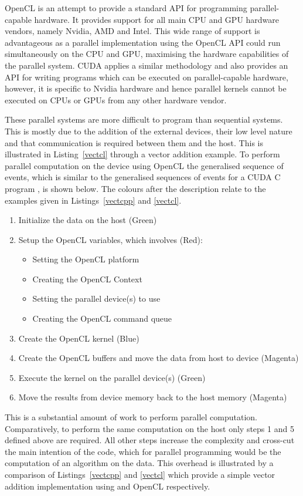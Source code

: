 \documentclass{sig-alternate-05-2015}
\begin{document}
OpenCL is an attempt to provide a standard API for programming parallel-capable
hardware. It provides support for all main CPU and GPU hardware vendors, namely
Nvidia, AMD and Intel. This wide range of support is advantageous as a 
parallel implementation using the OpenCL API could run simultaneously on the CPU
and GPU, maximising the hardware capabilities of the parallel system. \mbox{CUDA} applies 
a similar methodology and also provides an API for writing programs which can be 
executed on parallel-capable hardware, however, it is specific to Nvidia hardware 
and hence parallel kernels cannot be executed on CPUs or GPUs from any other 
hardware vendor.

These parallel systems are more difficult to program than sequential 
systems. This is mostly due to the addition of the external devices, 
their low level nature and that communication is required between them and the
host. This is illustrated in Listing~\ref{vectcl} through a vector addition
example. To perform parallel computation on the device using OpenCL 
the generalised sequence of events, which is similar to the generalised sequences 
of events for a CUDA C program \cite{harris:cuda}, is shown below. The colours after the 
description relate to the examples given in Listings~\ref{vectcpp} and
\ref{vectcl}.
\begin{enumerate}
	\item{Initialize the data on the host (Green)}
	\item{Setup the OpenCL variables, which involves (Red):
			\begin{itemize}
				\item{Setting the OpenCL platform }
				\item{Creating the OpenCL Context }
				\item{Setting the parallel device(s) to use }
				\item{Creating the OpenCL command queue }
		\end{itemize} }
	\item{Create the OpenCL kernel (Blue)}
	\item{Create the OpenCL buffers and move the data from host to
		device (Magenta)}
	\item{Execute the kernel on the parallel device(s) (Green)}
	\item{Move the results from device memory back to the host
		memory (Magenta)}
\end{enumerate}

This is a substantial amount of work to perform parallel computation.
Comparatively, to perform the same computation on the host only 
steps 1 and 5 defined above are required. All other steps increase
the complexity and cross-cut the main intention of
the \CPP code, which for parallel programming would be the computation of 
an algorithm on the data. This overhead is 
illustrated by a comparison of Listings~\ref{vectcpp} and \ref{vectcl} which 
provide a simple vector addition implementation using \CPP and OpenCL respectively.
\end{document}
